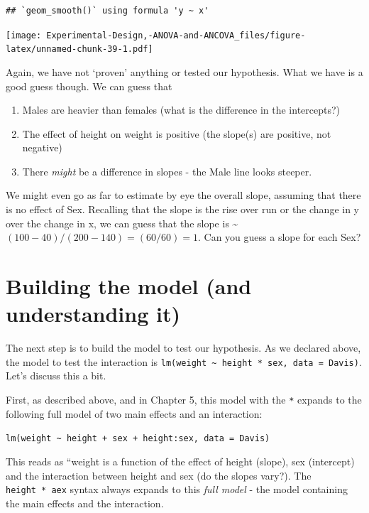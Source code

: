 \documentclass[
]{book}
\providecommand{\tightlist}{%
  \setlength{\itemsep}{0pt}\setlength{\parskip}{0pt}}
\begin{document}
\begin{verbatim}
## `geom_smooth()` using formula 'y ~ x'
\end{verbatim}

\texttt{[image: Experimental-Design,-ANOVA-and-ANCOVA\_files/figure-latex/unnamed-chunk-39-1.pdf]}

Again, we have not `proven' anything or tested our hypothesis. What we have is a good guess though. We can guess that

\begin{enumerate}
\def\labelenumi{\arabic{enumi}.}
\tightlist
\item
  Males are heavier than females (what is the difference in the intercepts?)
\item
  The effect of height on weight is positive (the slope(s) are positive, not negative)
\item
  There \emph{might} be a difference in slopes - the Male line looks steeper.
\end{enumerate}

We might even go as far to estimate by eye the overall slope, assuming that there is no effect of Sex. Recalling that the slope is the rise over run or the change in y over the change in x, we can guess that the slope is \textasciitilde{} \((100-40)/(200-140) = (60/60) = 1\). Can you guess a slope for each Sex?

\hypertarget{building-the-model-and-understanding-it}{%
\section{Building the model (and understanding it)}\label{building-the-model-and-understanding-it}}

The next step is to build the model to test our hypothesis. As we declared above, the model to test the interaction is \texttt{lm(weight\ \textasciitilde{}\ height\ *\ sex,\ data\ =\ Davis)}. Let's discuss this a bit.

First, as described above, and in Chapter 5, this model with the \texttt{*} expands to the following full model of two main effects and an interaction:

\texttt{lm(weight\ \textasciitilde{}\ height\ +\ sex\ +\ height:sex,\ data\ =\ Davis)}

This reads as ``weight is a function of the effect of height (slope), sex (intercept) and the interaction between height and sex (do the slopes vary?). The \texttt{height\ *\ aex} syntax always expands to this \emph{full model} - the model containing the main effects and the interaction.
\end{document}

